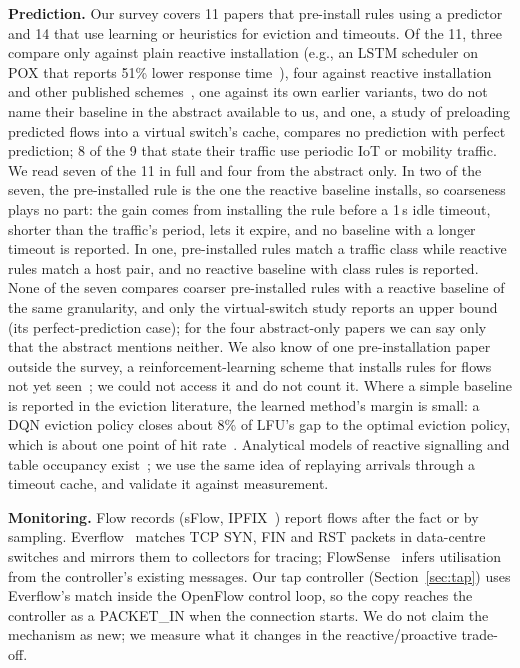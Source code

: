 \documentclass[conference]{IEEEtran}
\begin{document}
\textbf{Prediction.} Our survey covers 11 papers that pre-install rules using a predictor and 14 that use learning or heuristics for eviction and timeouts. Of the 11, three compare only against plain reactive installation (e.g., an LSTM scheduler on POX that reports 51\% lower response time~\cite{batista2024}), four against reactive installation and other published schemes~\cite{kim2022}, one against its own earlier variants, two do not name their baseline in the abstract available to us, and one, a study of preloading predicted flows into a virtual switch's cache, compares no prediction with perfect prediction; 8 of the 9 that state their traffic use periodic IoT or mobility traffic. We read seven of the 11 in full and four from the abstract only. In two of the seven, the pre-installed rule is the one the reactive baseline installs, so coarseness plays no part: the gain comes from installing the rule before a 1\,s idle timeout, shorter than the traffic's period, lets it expire, and no baseline with a longer timeout is reported. In one, pre-installed rules match a traffic class while reactive rules match a host pair, and no reactive baseline with class rules is reported. None of the seven compares coarser pre-installed rules with a reactive baseline of the same granularity, and only the virtual-switch study reports an upper bound (its perfect-prediction case); for the four abstract-only papers we can say only that the abstract mentions neither. We also know of one pre-installation paper outside the survey, a reinforcement-learning scheme that installs rules for flows not yet seen~\cite{hariri2024}; we could not access it and do not count it. Where a simple baseline is reported in the eviction literature, the learned method's margin is small: a DQN eviction policy closes about 8\% of LFU's gap to the optimal eviction policy, which is about one point of hit rate~\cite{rouf2025}. Analytical models of reactive signalling and table occupancy exist~\cite{metter2017}; we use the same idea of replaying arrivals through a timeout cache, and validate it against measurement.

\textbf{Monitoring.} Flow records (sFlow, IPFIX~\cite{ipfix}) report flows after the fact or by sampling. Everflow~\cite{everflow} matches TCP SYN, FIN and RST packets in data-centre switches and mirrors them to collectors for tracing; FlowSense~\cite{flowsense} infers utilisation from the controller's existing messages. Our tap controller (Section~\ref{sec:tap}) uses Everflow's match inside the OpenFlow control loop, so the copy reaches the controller as a PACKET\_IN when the connection starts. We do not claim the mechanism as new; we measure what it changes in the reactive/proactive trade-off.
\end{document}

